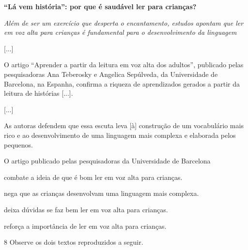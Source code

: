 \begin{myquote}
\textbf{``Lá vem história'': por que é saudável ler para crianças?}

\emph{Além de ser um exercício que desperta o encantamento, estudos
apontam que ler em voz alta para crianças é fundamental para o
desenvolvimento da linguagem}

{[}...{]}

O artigo ``Aprender a partir da leitura em voz alta dos adultos'',
publicado pelas pesquisadoras Ana Teberosky e Angelica Sepúlveda, da
Universidade de Barcelona, na Espanha, confirma a riqueza de
aprendizados gerados a partir da leitura de histórias {[}...{]}.

{[}...{]}

As autoras defendem que essa escuta leva {[}à{]} construção de um
vocabulário mais rico e ao desenvolvimento de uma linguagem mais
complexa e elaborada pelos pequenos.

\end{myquote}

O artigo publicado pelas pesquisadoras da Universidade de Barcelona

\begin{escolha}
\item combate a ideia de que é bom ler em voz alta para crianças.

\item nega que as crianças desenvolvam uma linguagem mais complexa.

\item deixa dúvidas se faz bem ler em voz alta para crianças.

\item reforça a importância de ler em voz alta para crianças.
\end{escolha}


\num{8} Observe os dois textos reproduzidos a seguir.


